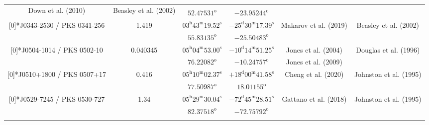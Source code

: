 \begin{landscape}
\begin{longtable}{cccccc}
    \multirow{2}[0]{*}{Down et al. (2010) \cite{RedRef17_2010}} & \multirow{2}[0]{*}{Beasley et al. (2002) \cite{CoordRef4_2002}} \\*
    & & $ 52.47531 ^\text{o}$ & $ -23.95244 ^\text{o}$ & & \\ \addlinespace
    \multirow{2}[0]{*}{J0343-2530 / PKS 0341-256} & \multirow{2}[0]{*}{ 1.419 } &  
    $ 03^\text{h}43^\text{m}19.52^\text{s} $  & $ -25^\text{d}30^\text{m}17.39^\text{s} $  & 
    \multirow{2}[0]{*}{Makarov et al. (2019) \cite{RedRef18_2019}} & \multirow{2}[0]{*}{Beasley et al. (2002) \cite{CoordRef4_2002}} \\*
    & & $ 55.83135 ^\text{o}$ & $ -25.50483 ^\text{o}$ & & \\ \addlinespace 

    \multirow{2}[0]{*}{J0504-1014 / PKS 0502-10} & \multirow{2}[0]{*}{ 0.040345 } &  
    $ 05^\text{h}04^\text{m}53.00^\text{s} $  & $ -10^\text{d}14^\text{m}51.25^\text{s} $  & 
    Jones et al. (2004) \cite{RedRef0_2004}  & \multirow{2}[0]{*}{Douglas et al. (1996) \cite{CoordRef10_1996}} \\*
    & & $ 76.22082 ^\text{o}$ & $ -10.24757 ^\text{o}$ & Jones et al. (2009)\cite{RedRef0_2009} & \\ \addlinespace 

  \multirow{2}[0]{*}{J0510+1800 / PKS 0507+17} & \multirow{2}[0]{*}{0.416} &  
    $ 05^\text{h}10^\text{m}02.37^\text{s}$  & $+18^\text{d}00^\text{m}41.58^\text{s}$  & 
    \multirow{2}[0]{*}{Cheng et al. (2020) \cite{RedRef20_2020}} & \multirow{2}[0]{*}{Johnston et al. (1995) \cite{CoordRef0_1995}} \\*
    & & $ 77.50987^\text{o}$ & $ 18.01155^\text{o}$ & & \\ \addlinespace 
  \multirow{2}[0]{*}{J0529-7245 / PKS 0530-727} & \multirow{2}[0]{*}{1.34} &  
    $ 05^\text{h}29^\text{m}30.04^\text{s}$  & $ -72^\text{d}45^\text{m}28.51^\text{s} $  & 
    \multirow{2}[0]{*}{Gattano et al. (2018) \cite{RedRef5_2018}} & \multirow{2}[0]{*}{Johnston et al. (1995) \cite{CoordRef0_1995}} \\*
    & & $ 82.37518 ^\text{o}$ & $ -72.75792 ^\text{o}$ & & \\ \addlinespace 


\end{longtable}
\end{landscape}
